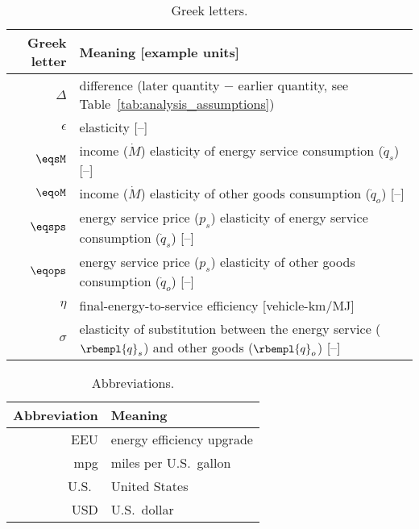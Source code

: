 
\begin{table}
\centering %
\caption{Greek letters.}
\begin{tabular}{r l}
  \toprule
  Greek letter & Meaning [example units] \\
  \midrule
  $\Delta$ & difference (later quantity $-$ earlier quantity, see Table~\ref{tab:analysis_assumptions}) \\
  $\epsilon$ & elasticity [--] \\
  $\eqsM$  & income ($\dot{M}$) elasticity of energy service consumption ($\dot{q}_s$) [--] \\
  $\eqoM$  & income ($\dot{M}$) elasticity of other goods consumption ($\dot{q}_o$) [--] \\
  $\eqsps$ & energy service price ($p_s$) elasticity of energy service consumption ($\dot{q}_s$) [--] \\
  $\eqops$ & energy service price ($p_s$) elasticity of other goods consumption ($\dot{q}_o$) [--] \\
  $\eta$ & final-energy-to-service efficiency [vehicle-km/MJ] \\
  $\sigma$ & elasticity of substitution between the energy service ($\rbempl{q}_s$) and other goods ($\rbempl{q}_o$) [--] \\
  \bottomrule
\end{tabular}
\label{tab:greek}
\end{table}



\begin{table}
\centering %
\caption{Abbreviations.}
\begin{tabular}{r l}
  \toprule
  Abbreviation & Meaning \\
  \midrule
  EEU & energy efficiency upgrade \\
  mpg & miles per U.S.\ gallon \\
  U.S.\ & United States \\
  USD & U.S.\ dollar \\
  \bottomrule
\end{tabular}
\label{tab:abbreviations}
\end{table}



